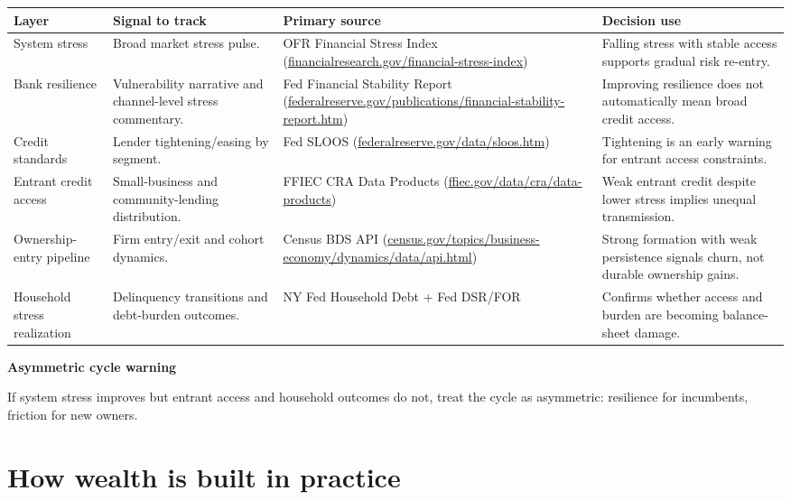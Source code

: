 \documentclass[11pt,openany]{book}
\begin{document}
\begin{center}
\small
\begin{tabularx}{\textwidth}{>{\raggedright\arraybackslash}p{}>{\raggedright\arraybackslash}p{}>{\raggedright\arraybackslash}p{}X}
\toprule
\textbf{Layer} & \textbf{Signal to track} & \textbf{Primary source} & \textbf{Decision use} \\
\midrule
System stress & Broad market stress pulse. & OFR Financial Stress Index (\url{financialresearch.gov/financial-stress-index}) & Falling stress with stable access supports gradual risk re-entry. \\
Bank resilience & Vulnerability narrative and channel-level stress commentary. & Fed Financial Stability Report (\url{federalreserve.gov/publications/financial-stability-report.htm}) & Improving resilience does not automatically mean broad credit access. \\
Credit standards & Lender tightening/easing by segment. & Fed SLOOS (\url{federalreserve.gov/data/sloos.htm}) & Tightening is an early warning for entrant access constraints. \\
Entrant credit access & Small-business and community-lending distribution. & FFIEC CRA Data Products (\url{ffiec.gov/data/cra/data-products}) & Weak entrant credit despite lower stress implies unequal transmission. \\
Ownership-entry pipeline & Firm entry/exit and cohort dynamics. & Census BDS API (\url{census.gov/topics/business-economy/dynamics/data/api.html}) & Strong formation with weak persistence signals churn, not durable ownership gains. \\
Household stress realization & Delinquency transitions and debt-burden outcomes. & NY Fed Household Debt + Fed DSR/FOR & Confirms whether access and burden are becoming balance-sheet damage. \\
\bottomrule
\end{tabularx}
\normalsize
\end{center}

\begin{notebox}
\textbf{Asymmetric cycle warning}\par
If system stress improves but entrant access and household outcomes do not, treat the cycle as asymmetric: resilience for incumbents, friction for new owners.
\end{notebox}

\chapter{How wealth is built in practice}
\end{document}

